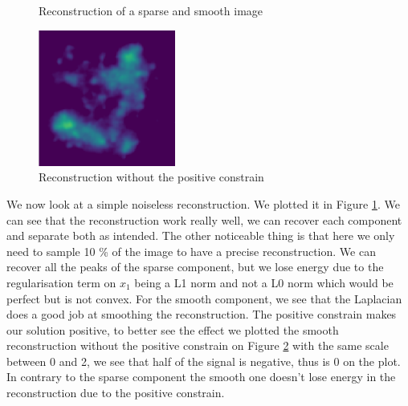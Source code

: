 \documentclass[a4paper,11pt,oneside]{report}
\theoremstyle{named}
\begin{document}
\begin{figure}
    \centering
    \caption{Reconstruction of a sparse and smooth image}
    \label{fig:SimpleReconstruction}
\end{figure}

\begin{figure}
    \centering
    \includegraphics[width=0.4\textwidth]{Without positive constrain.png}
    \caption{Reconstruction without the positive constrain}
    \label{fig:Without positive constrain}
\end{figure}
We now look at a simple noiseless reconstruction. We plotted it in Figure \ref{fig:SimpleReconstruction}. We can see that the reconstruction work really well, we can recover each component and separate both as intended. The other noticeable thing is that here we only need to sample 10 \% of the image to have a precise reconstruction. We can recover all the peaks of the sparse component, but we lose energy due to the regularisation term on $x_1$ being a L1 norm and not a L0 norm which would be perfect but is not convex. For the smooth component, we see that the Laplacian does a good job at smoothing the reconstruction. The positive constrain makes our solution positive, to better see the effect we plotted the smooth reconstruction without the positive constrain on Figure \ref{fig:Without positive constrain} with the same scale between 0 and 2, we see that half of the signal is negative, thus is 0 on the plot. In contrary to the sparse component the smooth one doesn't lose energy in the reconstruction due to the positive constrain.
\end{document}
